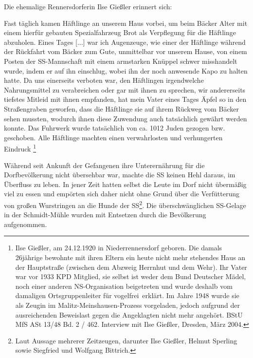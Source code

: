 Die ehemalige Rennersdorferin Ilse Gießler erinnert sich:
\begin{leftbar} 
Fast täglich kamen Häftlinge an unserem Haus vorbei, um beim Bäcker Alter mit einem hierfür gebauten Spezialfahrzeug Brot als Verpflegung für die Häftlinge abzuholen. Eines Tages {[}...{]} war ich Augenzeuge, wie einer der Häftlinge während der Rückfahrt vom Bäcker zum Gute, unmittelbar vor unserem Hause, von einem Posten der SS-Mannschaft mit einem armstarken Knüppel schwer misshandelt wurde, indem er auf ihn einschlug, wobei ihn der noch anwesende Kapo zu halten hatte. Da uns einerseits verboten war, den Häftlingen irgendwelche Nahrungsmittel zu verabreichen oder gar mit ihnen zu sprechen, wir andererseits tiefstes Mitleid mit ihnen empfanden, hat mein Vater eines Tages Äpfel so in den Straßengraben geworfen, dass die Häftlinge sie auf ihrem Rückweg vom Bäcker sehen mussten, wodurch ihnen diese Zuwendung auch tatsächlich gewährt werden konnte. Das Fuhrwerk wurde tatsächlich von ca. 10\textendash{}12 Juden gezogen bzw. geschoben. Alle Häftlinge machten einen verwahrlosten und verhungerten Eindruck
\footnote{Ilse Gießler, am 24.12.1920 in Niederrennersdorf geboren. Die damals 26jährige bewohnte mit ihren Eltern ein heute nicht mehr stehendes Haus an der Hauptstraße (zwischen dem Abzweig Herrnhut und dem Wehr). Ihr Vater war vor 1933 KPD Mitglied, sie selbst ist weder dem Bund Deutscher Mädel, noch einer anderen NS-Organisation beigetreten und wurde deshalb vom damaligen Ortsgruppenleiter für \glqq vogelfrei\grqq~erklärt. Im Jahre 1948 wurde sie als Zeugin im Malitz-Meinshausen-Prozess vorgeladen, jedoch aufgrund der ausreichenden Beweislast gegen die Angeklagten nicht mehr angehört. BStU MfS ASt 13/48 Bd. 2 / 462. Interview mit Ilse Gießler, Dresden, März 2004.} 
\end{leftbar}


Während seit Ankunft der Gefangenen ihre Unterernährung für die Dorfbevölkerung nicht übersehbar war, machte die SS keinen Hehl daraus, im Überfluss zu leben. In jener Zeit hatten selbst die Leute im Dorf nicht übermäßig viel zu essen und empörten sich daher nicht ohne Grund über die Verfütterung von großen Wurstringen an die Hunde der SS\footnote{Laut Aussage mehrerer Zeitzeugen, darunter Ilse Gießler, Helmut Sperling sowie Siegfried und Wolfgang Bittrich.}. Die überschwänglichen SS-Gelage in der Schmidt-Mühle wurden mit Entsetzen durch die Bevölkerung aufgenommen.

